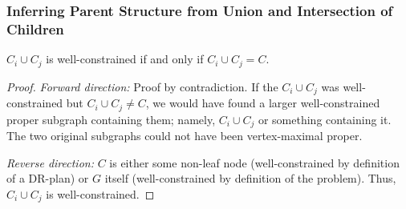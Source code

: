 









\subsubsection{Inferring Parent Structure from Union and Intersection of Children}
\label{sec:infer_parent}


\begin{lemma}\label{lemma:wc_intersection_is_C}
$C_i\cup C_j$ is well-constrained if and only if $C_i\cup C_j = C$.
\end{lemma}

\begin{proof}
\textit{Forward direction:} Proof by contradiction. If the $C_i\cup C_j$ was well-constrained but $C_i\cup C_j \neq C$, we would have found a larger well-constrained proper subgraph containing them; namely, $C_i\cup C_j$ or something containing it. The two original subgraphs could not have been vertex-maximal proper.

\textit{Reverse direction:} $C$ is either some non-leaf node (well-constrained by definition of a DR-plan) or $G$ itself (well-constrained by definition of the problem). Thus, $C_i\cup C_j$ is well-constrained.
\end{proof}

